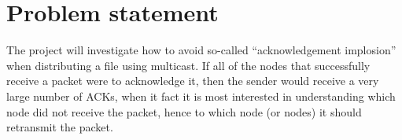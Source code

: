 \section{Problem statement}
\label{sect:problem_statement}

The project will investigate how to avoid so-called “acknowledgement implosion” when distributing a file using multicast. If all of the nodes that successfully receive a packet were to acknowledge it, then the sender would receive a very large number of \glspl{ACK}, when it fact it is most interested in understanding which node did not receive the packet, hence to which node (or nodes) it should retransmit the packet.
